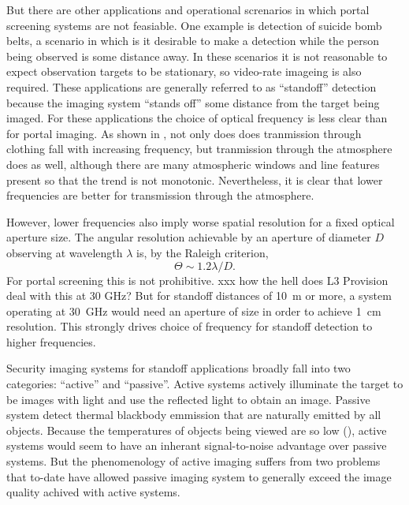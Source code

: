 But there are other applications and operational screnarios in which portal screening systems are not feasiable.
One example is detection of suicide bomb belts, a scenario in which is it desirable to make a detection while the person being observed is some distance away.
In these scenarios it is not reasonable to expect observation targets to be stationary, so video-rate imageing is also required.
These applications are generally referred to as ``standoff'' detection because the imaging system ``stands off'' some distance from the target being imaged.
For these applications the choice of optical frequency is less clear than for portal imaging.
As shown in , not only does does tranmission through clothing fall with increasing frequency, but tranmission through the atmosphere does as well, although there are many atmospheric windows and line features present so that the trend is not monotonic.
Nevertheless, it is clear that lower frequencies are better for transmission through the atmosphere.

However, lower frequencies also imply worse spatial resolution for a fixed optical aperture size.
The angular resolution achievable by an aperture of diameter $D$ observing at wavelength $\lambda$ is, by the Raleigh criterion,
\begin{equation} \label{eqn:ch1-raleigh}
  \Theta \sim 1.2 \lambda / D.
\end{equation}
For portal screening this is not prohibitive. xxx how the hell does L3 Provision deal with this at 30 GHz?
But for standoff distances of \SI{10}{\m} or more, a system operating at \SI{30}{\GHz} would need an aperture of size  in order to achieve \SI{1}{\cm} resolution.
This strongly drives choice of frequency for standoff detection to higher frequencies.

Security imaging systems for standoff applications broadly fall into two categories: ``active'' and ``passive''.
Active systems actively illuminate the target to be images with light and use the reflected light to obtain an image.
Passive system detect thermal blackbody emmission that are naturally emitted by all objects.
Because the temperatures of objects being viewed are so low (), active systems would seem to have an inherant signal-to-noise advantage over passive systems.
But the phenomenology of active imaging suffers from two problems that to-date have allowed passive imaging system to generally exceed the image quality achived with active systems.


